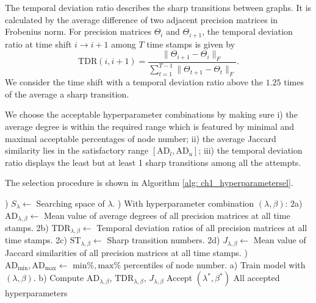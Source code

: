 The temporal deviation ratio describes the sharp transitions between graphs. 
It is calculated by the average difference of two adjacent precision matrices in Frobenius norm. 
For precision matrices $\Theta_i$ and $\Theta_{i+1}$, the temporal deviation ratio at time shift $i\rightarrow i+1$ among $T$ time stamps is given by
\begin{equation*}
    \text{TDR}(i, i+1) = \frac{\|\Theta_{i+1}-\Theta_i\|_F}{\sum_{t=1}^{T-1}\|\Theta_{t+1}-\Theta_{t}\|_F}.
\end{equation*} 
We consider the time shift with a temporal deviation ratio above the $1.25$ times of the average a sharp transition. 

We choose the acceptable hyperparameter combinations by making sure
i) the average degree is within the required range which is featured by minimal and maximal acceptable percentages of node number; 
ii) the average Jaccard similarity lies in the satisfactory range $[\text{AD}_{l},\text{AD}_u]$;
iii) the temporal deviation ratio displays the least but at least 1 sharp transitions among all the attempts. 

The selection procedure is shown in Algorithm \ref{alg: ch1_hyperparametersel}. 

\begin{algorithm}
    \caption{Hyperparameter selection with warm start}
    \begin{algorithmic}
        ) $S_{\lambda}\longleftarrow$ Searching space of $\lambda$.
        ) With hyperparameter combination $(\lambda, \beta)$:
        \State \quad 2a) $\text{AD}_{\lambda,\beta}\longleftarrow$ Mean value of average degrees of all precision matrices at all time stamps.
        \State \quad 2b) $\text{TDR}_{\lambda,\beta}\longleftarrow$ Temporal deviation ratios of all precision matrices at all time stamps.
        \State \quad 2c) $\text{ST}_{\lambda,\beta}\longleftarrow$ Sharp transition numbers. 
        \State \quad 2d) $J_{\lambda,\beta}\longleftarrow$ Mean value of Jaccard similarities of all precision matrices at all time stamps.
        ) $\text{AD}_{\text{min}}, \text{AD}_{\text{max}}\longleftarrow$ $\text{min}\%, \text{max}\%$ percentiles of node number. 
            \State a) Train model with $(\lambda, \beta)$.
            \State b) Compute $\text{AD}_{\lambda,\beta}$, $\text{TDR}_{\lambda,\beta}$, $J_{\lambda,\beta}$
            \EndFor
                \State Accept $(\lambda^*, \beta^*)$
            \EndIf
        \EndFor
        \State \Return All accepted hyperparameters
    \end{algorithmic}
    \label{alg: ch1_hyperparametersel}
\end{algorithm}